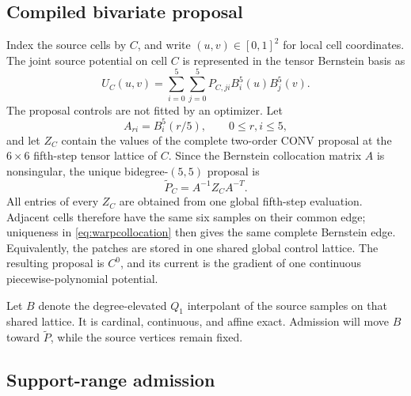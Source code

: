 \documentclass[journal]{IEEEtran}
\begin{document}
\subsection{Compiled bivariate proposal}

Index the source cells by \(C\), and write \((u,v)\in[0,1]^2\) for local
cell coordinates.  The joint source potential on cell \(C\) is represented
in the tensor Bernstein basis as
\begin{equation}
 U_C(u,v)=\sum_{i=0}^{5}\sum_{j=0}^{5}
 P_{C,ji}B_i^5(u)B_j^5(v).
 \label{eq:warppatch}
\end{equation}
The proposal controls are not fitted by an optimizer.  Let
\begin{equation}
 A_{ri}=B_i^5(r/5),\qquad 0\leq r,i\leq5,
 \label{eq:warpcollocation}
\end{equation}
and let \(Z_C\) contain the values of the complete two-order CONV proposal at
the \(6\times6\) fifth-step tensor lattice of \(C\).  Since the Bernstein
collocation matrix \(A\) is nonsingular, the unique bidegree-\((5,5)\)
proposal is
\begin{equation}
 \widetilde P_C=A^{-1}Z_CA^{-T}.
 \label{eq:warpproposal}
\end{equation}
All entries of every \(Z_C\) are obtained from one global fifth-step
evaluation.  Adjacent cells therefore have the same six samples on their
common edge; uniqueness in \eqref{eq:warpcollocation} then gives the same
complete Bernstein edge.  Equivalently, the patches are stored in one shared
global control lattice.  The resulting proposal is \(C^0\), and its current
is the gradient of one continuous piecewise-polynomial potential.

Let \(B\) denote the degree-elevated \(Q_1\) interpolant of the source
samples on that shared lattice.  It is cardinal, continuous, and affine
exact.  Admission will move \(B\) toward \(\widetilde P\), while the source
vertices remain fixed.

\subsection{Support-range admission}
\end{document}
